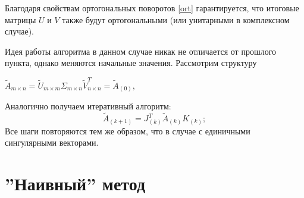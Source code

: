 \begin{note}
    Благодаря свойствам ортогональных поворотов \eqref{ort} гарантируется, что итоговые матрицы $U$ и $V$ также будут ортогональными (или унитарными в комплексном случае). 
\end{note}


Идея работы алгоритма в данном случае никак не отличается от прошлого пункта, однако меняются начальные значения. Рассмотрим структуру 
\begin{center}
    $\tilde{A}_{m \times n} = \tilde{U}_{m\times m}\Sigma_{m\times n}\tilde{V}^T_{n \times n} = \tilde{A}_{(0)}$,
\end{center}
Аналогично получаем итеративный алгоритм:
\begin{equation}
    \tilde{A}_{(k+1)}= J^T_{(k)}\tilde{A}_{(k)}K_{(k)};
\end{equation}
Все шаги повторяются тем же образом, что в случае с единичными сингулярными векторами.





\newpage
\section{''Наивный'' метод}


